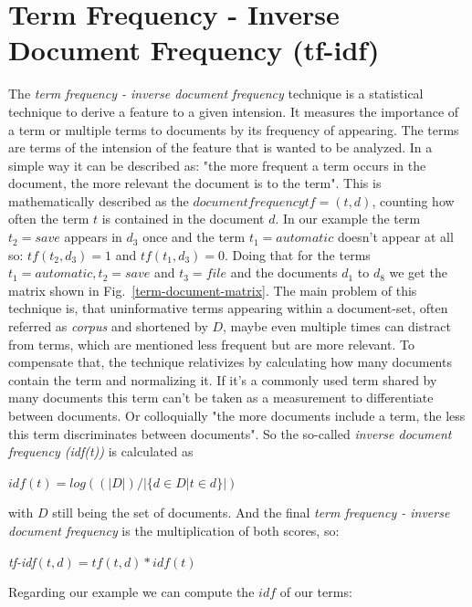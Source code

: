 \section{Term Frequency - Inverse Document Frequency (tf-idf)}
The \emph{term frequency - inverse document frequency} technique is a statistical technique to derive a feature to a given intension. It measures the importance of a term or multiple terms to documents by its frequency of appearing. The terms are terms of the intension of the feature that is wanted to be analyzed. In a simple way it can be described as: "the more frequent a term occurs in the document, the more relevant the document is to the term". \newline
This is mathematically described as the $document frequency tf=(t,d)$, counting how often the term $t$ is contained in the document $d$.
In our example the term $t_2 = save$ appears in $d_3$ once and the term $t_1 = automatic$ doesn't appear at all so: $tf(t_2,d_3) = 1$ and $tf(t_1,d_3)=0$. \newline
Doing that for the terms $t_1 = automatic, t_2 = save$ and $t_3 = file$ and the documents $d_1$ to $d_8$ we get the matrix shown in Fig.~\ref{term-document-matrix}.
The main problem of this technique is, that uninformative terms appearing within a document-set, often referred as \emph{corpus} and shortened by $D$, maybe even multiple times can distract from terms, which are mentioned less frequent but are more relevant. To compensate that, the technique relativizes by calculating how many documents contain the term and normalizing it. If it's a commonly used term shared by many documents this term can't be taken as a measurement to differentiate between documents. Or colloquially "the more documents include a term, the less this term discriminates between documents". \newline
So the so-called \emph{inverse document frequency (idf(t))} is calculated as
\begin{center} $idf(t) = log((|D|)/|\{ d \in D | t \in d \}|)$  \end{center}
with $D$ still being the set of documents. And the final \emph{term frequency - inverse document frequency} is the multiplication of both scores, so:
\begin{center} \emph{tf-idf}$(t,d) = tf(t,d) * idf(t)$\end{center}
Regarding our example we can compute the $idf$ of our terms:


